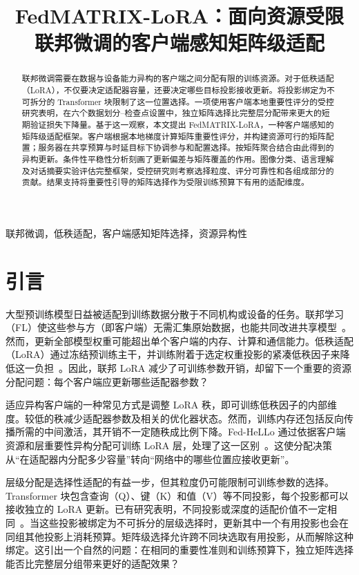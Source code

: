 \documentclass[10pt,conference,letterpaper]{IEEEtran}
\title{FedMATRIX-LoRA：面向资源受限联邦微调的客户端感知矩阵级适配}
\author{\IEEEauthorblockN{匿名作者}}
\begin{document}
\maketitle

\begin{abstract}
联邦微调需要在数据与设备能力异构的客户端之间分配有限的训练资源。对于低秩适配（LoRA），不仅要决定适配器容量，还要决定哪些目标投影接收更新。将投影绑定为不可拆分的 Transformer 块限制了这一位置选择。一项使用客户端本地重要性评分的受控研究表明，在六个数据划分--检查点设置中，独立矩阵选择比完整层分配带来更大的短期验证损失下降量。基于这一观察，本文提出 FedMATRIX-LoRA，一种客户端感知的矩阵级适配框架。客户端根据本地梯度计算矩阵重要性评分，并构建资源可行的矩阵配置；服务器在共享预算与时延目标下协调参与和配置选择。按矩阵聚合结合由此得到的异构更新。条件性平稳性分析刻画了更新偏差与矩阵覆盖的作用。图像分类、语言理解及对话摘要实验评估完整框架，受控研究则考察选择粒度、评分可靠性和各组成部分的贡献。结果支持将重要性引导的矩阵选择作为受限训练预算下有用的适配维度。

\end{abstract}

\begin{IEEEkeywords}
联邦微调，低秩适配，客户端感知矩阵选择，资源异构性
\end{IEEEkeywords}

\section{引言}
大型预训练模型日益被适配到训练数据分散于不同机构或设备的任务。联邦学习（FL）使这些参与方（即客户端）无需汇集原始数据，也能共同改进共享模型~\cite{mcmahan2017communication,kairouz2021advances}。然而，更新全部模型权重可能超出单个客户端的内存、计算和通信能力。低秩适配（LoRA）通过冻结预训练主干，并训练附着于选定权重投影的紧凑低秩因子来降低这一负担~\cite{hu2022lora}。因此，联邦 LoRA 减少了可训练参数开销，却留下一个重要的资源分配问题：每个客户端应更新哪些适配器参数？

适应异构客户端的一种常见方式是调整 LoRA 秩，即可训练低秩因子的内部维度。较低的秩减少适配器参数及相关的优化器状态。然而，训练内存还包括反向传播所需的中间激活，其开销不一定随秩成比例下降。Fed-HeLLo 通过依据客户端资源和层重要性异构分配可训练 LoRA 层，处理了这一区别~\cite{zhang2025fedhello}。这使分配决策从“在适配器内分配多少容量”转向“网络中的哪些位置应接收更新”。

层级分配是选择性适配的有益一步，但其粒度仍可能限制可训练参数的选择。Transformer 块包含查询（Q）、键（K）和值（V）等不同投影，每个投影都可以接收独立的 LoRA 更新。已有研究表明，不同投影或深度的适配价值不一定相同~\cite{hu2022lora,fm_adalora2023}。当这些投影被绑定为不可拆分的层级选择时，更新其中一个有用投影也会在同组其他投影上消耗预算。矩阵级选择允许跨不同块选取有用投影，从而解除这种绑定。这引出一个自然的问题：在相同的重要性准则和训练预算下，独立矩阵选择能否比完整层分组带来更好的适配效果？
\end{document}
